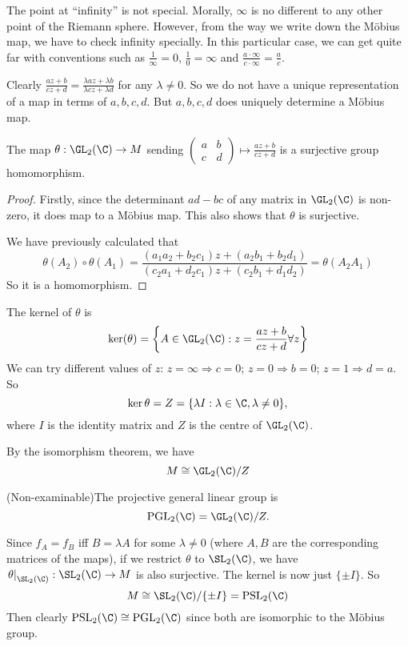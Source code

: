 \documentclass[a4pape]{article}
\begin{document}
\note The point at ``infinity'' is not special. Morally, $\infty$ is no different to any other point of the Riemann sphere. However, from the way we write down the M\"obius map, we have to check infinity specially. In this particular case, we can get quite far with conventions such as $\frac{1}{\infty} = 0$, $\frac{1}{0} = \infty$ and $\frac{a\cdot \infty}{c\cdot \infty} = \frac{a}{c}$.

Clearly $\frac{az + b}{cz + d} = \frac{\lambda az + \lambda b}{\lambda cz + \lambda d}$ for any $\lambda \not= 0$. So we do not have a unique representation of a map in terms of $a, b, c, d$. But $a, b, c, d$ does uniquely determine a M\"obius map.

\begin{prop}
  The map $\theta: \GL_2(\C)\to M$ sending $
  \displaystyle \begin{pmatrix}
    a & b\\
    c & d
  \end{pmatrix} \mapsto \frac{az + b}{cz + d}$ is a surjective group homomorphism.
\end{prop}

\begin{proof}
  Firstly, since the determinant $ad - bc$ of any matrix in $\GL_2(\C)$ is non-zero, it does map to a M\"obius map. This also shows that $\theta$ is surjective.

  We have previously calculated that
  \[
  \theta(A_2)\circ \theta(A_1) = \frac{(a_1a_2 + b_2c_1)z + (a_2b_1 + b_2d_1)}{(c_2a_1 + d_2c_1)z + (c_2b_1 + d_1d_2)} = \theta(A_2A_1)
  \]
So it is a homomorphism.
\end{proof}

The kernel of $\theta$ is
\[
\ker(\theta) = \left\{A\in \GL_2(\C): z = \frac{az + b}{cz + d}\forall z\right\}
\]
We can try different values of $z$: $z = \infty \Rightarrow c = 0$; $z = 0 \Rightarrow b = 0$; $z = 1\Rightarrow d = a$. So
\[
\ker\theta = Z = \{\lambda I: \lambda \in \C, \lambda\not= 0\},
\]
where $I$ is the identity matrix and $Z$ is the centre of $\GL_2(\C)$. 

By the isomorphism theorem, we have
\[
M \cong \GL_2(\C)/Z
\]

\begin{defi}
  (Non-examinable)The projective general linear group is
\[
\mathrm{PGL}_2(\C) = \GL_2(\C)/Z.
\]
\end{defi}
\note Since $f_A = f_B$ iff $B = \lambda A$ for some $\lambda\not= 0$ (where $A, B$ are the corresponding matrices of the maps), if we restrict $\theta$ to $\SL_2(\C)$, we have $\left.\theta\right|_{\SL_2(\C)}: \SL_2(\C)\to M$ is also surjective. The kernel is now just $\{\pm I\}$. So
\[
M \cong \SL_2(\C)/\{\pm I\} = \mathrm{PSL_2}(\C)
\]
\note Then clearly $\mathrm{PSL}_2(\C)\cong \mathrm{PGL}_2(\C)$ since both are isomorphic to the M\"obius group.
\end{document}

